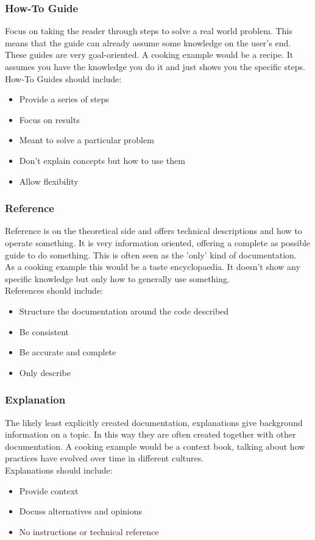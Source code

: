 \documentclass{article}
\begin{document}
	\subsubsection{How-To Guide}
	Focus on taking the reader through steps to solve a real world problem. This means that the guide can already assume some knowledge on the user's end. These guides are very goal-oriented. A cooking example would be a recipe. It assumes you have the knowledge you do it and just shows you the specific steps. \\
	How-To Guides should include:
	\begin{itemize}
		\item{Provide a series of steps}
		\item{Focus on results}
		\item{Meant to solve a particular problem}
		\item{Don't explain concepts but how to use them}
		\item{Allow flexibility}
	\end{itemize}
	\subsubsection{Reference}
	Reference is on the theoretical side and offers technical descriptions and how to operate something. It is very information oriented, offering a complete as possible guide to do something. This is often seen as the 'only' kind of documentation. \\
	As a cooking example this would be a taste encyclopaedia. It doesn't show any specific knowledge but only how to generally use something. \\
	References should include:
	\begin{itemize}
		\item{Structure the documentation around the code described}
		\item{Be consistent}
		\item{Be accurate and complete}
		\item{Only describe}
	\end{itemize}
	\subsubsection{Explanation}
	The likely least explicitly created documentation, explanations give background information on a topic. In this way they are often created together with other documentation. A cooking example would be a context book, talking about how practices have evolved over time in different cultures. \\
	Explanations should include:
	\begin{itemize}
		\item{Provide context}
		\item{Docuss alternatives and opinions}
		\item{No instructions or technical reference}
	\end{itemize}
\end{document}
